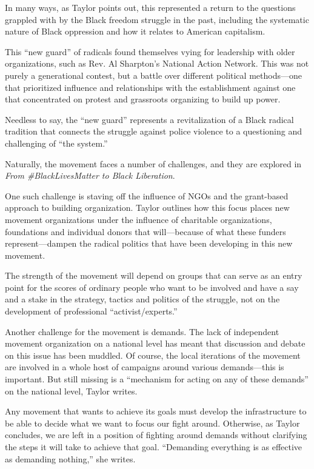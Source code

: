 In many ways, as Taylor points out, this represented a return to the questions grappled with by the Black freedom struggle in the past, including the systematic nature of Black oppression and how it relates to American capitalism.

This ``new guard'' of radicals found themselves vying for leadership with older organizations, such as Rev. Al Sharpton's National Action Network. This was not purely a generational contest, but a battle over different political methods---one that prioritized influence and relationships with the establishment against one that concentrated on protest and grassroots organizing to build up power.

Needless to say, the ``new guard'' represents a revitalization of a Black radical tradition that connects the struggle against police violence to a questioning and challenging of ``the system.''

Naturally, the movement faces a number of challenges, and they are explored in \emph{From \#BlackLivesMatter to Black Liberation}.

One such challenge is staving off the influence of NGOs and the grant-based approach to building organization. Taylor outlines how this focus places new movement organizations under the influence of charitable organizations, foundations and individual donors that will---because of what these funders represent---dampen the radical politics that have been developing in this new movement.

The strength of the movement will depend on groups that can serve as an entry point for the scores of ordinary people who want to be involved and have a say and a stake in the strategy, tactics and politics of the struggle, not on the development of professional ``activist/experts.''

Another challenge for the movement is demands. The lack of independent movement organization on a national level has meant that discussion and debate on this issue has been muddled. Of course, the local iterations of the movement are involved in a whole host of campaigns around various demands---this is important. But still missing is a ``mechanism for acting on any of these demands'' on the national level, Taylor writes.

Any movement that wants to achieve its goals must develop the infrastructure to be able to decide what we want to focus our fight around. Otherwise, as Taylor concludes, we are left in a position of fighting around demands without clarifying the steps it will take to achieve that goal. ``Demanding everything is as effective as demanding nothing,'' she writes.

